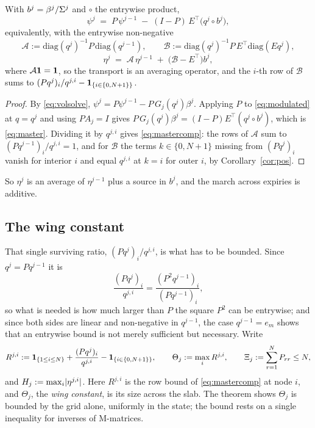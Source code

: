 \begin{proposition}\label{prop:master}
With $b^j=\beta^j/\Sigma^j$ and $\circ$ the entrywise product,
\begin{equation}\label{eq:master}
  \psi^{j}\;=\;P\,\psi^{j-1}\;-\;(I-P)\,E^{\!\top}\bigl(q^{j}\!\circ b^{j}\bigr),
\end{equation}
equivalently, with the entrywise non-negative
\[
  \mathcal A:=\mathrm{diag}(q^{j})^{-1}P\,\mathrm{diag}(q^{j-1}),
  \qquad
  \mathcal B:=\mathrm{diag}(q^{j})^{-1}P\,E^{\!\top}\mathrm{diag}(Eq^{j}),
\]
\begin{equation}\label{eq:mastercomp}
  \eta^{j}\;=\;\mathcal A\,\eta^{j-1}\;+\;\bigl(\mathcal B-E^{\!\top}\bigr)b^{j} ,
\end{equation}
where $\mathcal A\mathbf 1=\mathbf 1$, so the transport is an averaging operator, and the
$i$-th row of $\mathcal B$ sums to
$(Pq^{j})_i/q^{j,i}-\mathbf 1_{\{i\in\{0,N+1\}\}}$.
\end{proposition}

\begin{proof}
By \eqref{eq:volsolve}, $\psi^j=P\psi^{j-1}-P\,G_j(q^j)\beta^j$. Applying $P$ to
\eqref{eq:modulated} at $q=q^j$ and using $PA_j=I$ gives
$P\,G_j(q^j)\beta^j=(I-P)E^{\!\top}(q^j\!\circ b^j)$, which is \eqref{eq:master}.
Dividing it by $q^{j,i}$ gives \eqref{eq:mastercomp}: the rows of $\mathcal A$ sum to
$(Pq^{j-1})_i/q^{j,i}=1$, and for $\mathcal B$ the terms $k\in\{0,N+1\}$ missing from
$(Pq^j)_i$ vanish for interior $i$ and equal $q^{j,i}$ at $k=i$ for outer $i$, by
Corollary~\ref{cor:pos}.
\end{proof}

So $\eta^j$ is an average of $\eta^{j-1}$ plus a source in $b^j$, and the march
across expiries is additive.

\subsection{The wing constant}\label{sec:bound}

That single surviving ratio, $(Pq^j)_i/q^{j,i}$, is what has to be bounded. Since
$q^j=Pq^{j-1}$ it is
\begin{equation}\label{eq:P2ratio}
  \frac{(Pq^{j})_i}{q^{j,i}}=\frac{(P^{2}q^{j-1})_i}{(Pq^{j-1})_i} ,
\end{equation}
so what is needed is how much larger than $P$ the square $P^{2}$ can be entrywise;
and since both sides are linear and non-negative in $q^{j-1}$, the case
$q^{j-1}=e_m$ shows that an entrywise bound is not merely sufficient but
necessary. Write
\begin{equation}\label{eq:rows}
  R^{j,i}:=\mathbf 1_{\{1\le i\le N\}}+\frac{(Pq^j)_i}{q^{j,i}}-\mathbf 1_{\{i\in\{0,N+1\}\}},
  \qquad
  \Theta_j:=\max_i R^{j,i},
  \qquad
  \Xi_j:=\sum_{r=1}^{N}P_{rr}\le N ,
\end{equation}
and $H_j:=\max_i\lvert \eta^{j,i}\rvert$. Here $R^{j,i}$ is the row bound of
\eqref{eq:mastercomp} at node $i$, and $\Theta_j$, the \emph{wing constant}, is its
size across the slab. The theorem shows $\Theta_j$ is bounded by the grid alone,
uniformly in the state; the bound rests on a single inequality for inverses of
M-matrices.

